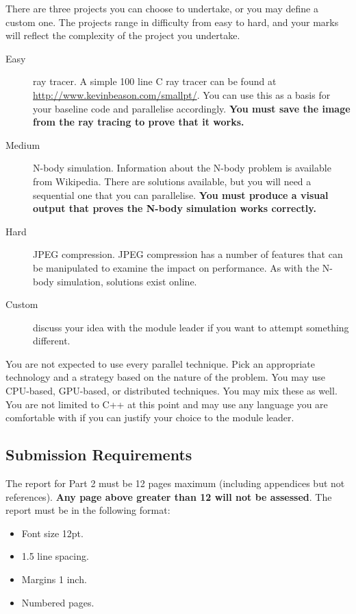\documentclass[a4paper, 12pt]{article}
\begin{document}
There are three projects you can choose to undertake, or you may define a custom one. The projects range in difficulty from easy to hard, and your marks will reflect the complexity of the project you undertake.

\begin{description}
	\item[Easy] ray tracer.  A simple 100 line C ray tracer can be found at \url{http://www.kevinbeason.com/smallpt/}.  You can use this as a basis for your baseline code and parallelise accordingly.  \textbf{You must save the image from the ray tracing to prove that it works.}
	\item[Medium] N-body simulation. Information about the N-body problem is available from 	Wikipedia. There are solutions available, but you will need a sequential one that you can parallelise. \textbf{You must produce a visual output that proves the N-body simulation works correctly.}
	\item[Hard] JPEG compression. JPEG compression has a number of features that can be manipulated to examine the impact on performance. As with the N-body simulation,	solutions exist online.
	\item[Custom] discuss your idea with the module leader if you want to attempt something different.
\end{description}

You are not expected to use every parallel technique. Pick an appropriate technology and a strategy based on the nature of the problem. You may use CPU-based, GPU-based, or distributed techniques. You may mix these as well. You are not limited to C++ at this point and may use any language you are comfortable with if you can justify your choice to the module leader.

\subsection*{Submission Requirements}

The report for Part 2 must be 12 pages maximum (including appendices but not references).  {\bfseries Any page above greater than 12 will not be assessed}.  The report must be in the following format:

\begin{itemize}
	\item Font size 12pt.
	\item 1.5 line spacing.
	\item Margins 1 inch.
	\item Numbered pages.
\end{itemize}
\end{document}
